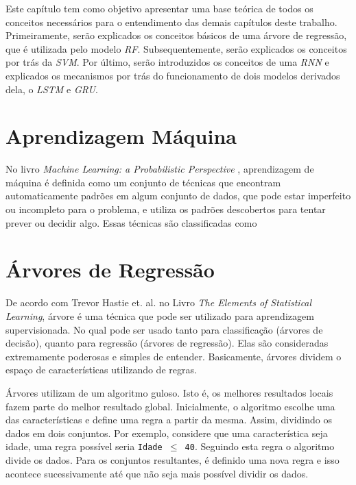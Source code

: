 Este capítulo tem como objetivo apresentar uma base teórica de todos os conceitos necessários para o entendimento das demais capítulos deste trabalho. Primeiramente, serão explicados os conceitos básicos de uma árvore de regressão, que é utilizada pelo modelo \textit{\acrshort{RF}}. Subsequentemente, serão explicados os conceitos por trás da \textit{\acrshort{SVM}}. Por último, serão introduzidos os conceitos de uma \textit{\acrfull{RNN}} e explicados os mecanismos por trás do funcionamento de dois modelos derivados dela, o \textit{\acrshort{LSTM}} e \textit{\acrshort{GRU}}.

\section{Aprendizagem Máquina}

No livro \textit{Machine Learning: a Probabilistic Perspective} \cite{murphy2012machine}, aprendizagem de máquina é definida como um conjunto de técnicas que encontram automaticamente padrões em algum conjunto de dados, que pode estar imperfeito ou incompleto para o problema, e utiliza os padrões descobertos para tentar prever ou decidir algo. Essas técnicas são classificadas como 



\section{Árvores de Regressão}

De acordo com Trevor Hastie et. al. no Livro \textit{The Elements of Statistical Learning}, árvore é uma técnica que pode ser utilizado para aprendizagem supervisionada. No qual pode ser usado tanto para classificação (árvores de decisão), quanto para regressão (árvores de regressão). Elas são consideradas extremamente poderosas e simples de entender. Basicamente, árvores dividem o espaço de características utilizando de regras.


Árvores utilizam de um algoritmo guloso. Isto é, os melhores resultados locais fazem parte do melhor resultado global. Inicialmente, o algoritmo escolhe uma das características e define uma regra a partir da mesma. Assim, dividindo os dados em dois conjuntos. Por exemplo, considere que uma característica seja idade, uma regra possível seria \texttt{Idade \(\leq\) 40}. Seguindo esta regra o algoritmo divide os dados. Para os conjuntos resultantes, é definido uma nova regra e isso acontece sucessivamente até que não seja mais possível dividir os dados.

